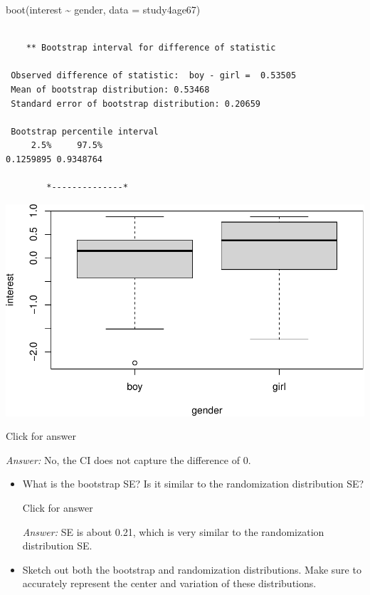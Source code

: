 \documentclass[
]{book}
\newenvironment{Shaded}{\begin{snugshade}}{\end{snugshade}}
\newcommand{\AttributeTok}[1]{\textcolor[rgb]{0.77,0.63,0.00}{#1}}
\newcommand{\FunctionTok}[1]{\textcolor[rgb]{0.00,0.00,0.00}{#1}}
\newcommand{\NormalTok}[1]{#1}
\newcommand{\SpecialCharTok}[1]{\textcolor[rgb]{0.00,0.00,0.00}{#1}}
\begin{document}
\begin{Shaded}
\begin{Highlighting}[]
\FunctionTok{boot}\NormalTok{(interest }\SpecialCharTok{\textasciitilde{}}\NormalTok{ gender, }\AttributeTok{data =}\NormalTok{ study4age67)}
\end{Highlighting}
\end{Shaded}

\begin{verbatim}

    ** Bootstrap interval for difference of statistic

 Observed difference of statistic:  boy - girl =  0.53505 
 Mean of bootstrap distribution: 0.53468 
 Standard error of bootstrap distribution: 0.20659 

 Bootstrap percentile interval
     2.5%     97.5% 
0.1259895 0.9348764 

        *--------------*
\end{verbatim}

\includegraphics[width=1\linewidth]{Class_Activity_14_files/figure-latex/unnamed-chunk-10-1}

Click for answer

\emph{Answer:} No, the CI does not capture the difference of 0.

\vspace*{.5in}

\begin{itemize}
\item
  What is the bootstrap SE? Is it similar to the randomization distribution SE?

  Click for answer

  \emph{Answer:} SE is about 0.21, which is very similar to the randomization distribution SE.

  \vspace*{.5in}
\item
  Sketch out both the bootstrap and randomization distributions. Make sure to accurately represent the center and variation of these distributions.
\end{itemize}
\end{document}
